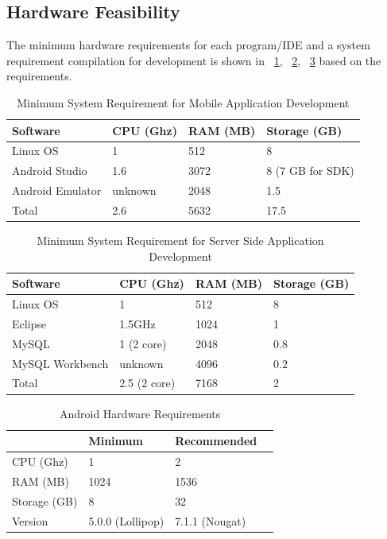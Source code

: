 \subsection{Hardware Feasibility}
The minimum hardware requirements for each program/IDE and
a system requirement compilation for development is shown in ~\ref{minreqmobile}, ~\ref{minreqserver}, ~\ref{androidhardware} based on the requirements.

\begin{table}[!ht]
\centering
\caption{Minimum System Requirement for Mobile Application Development}
\label{minreqmobile}
\begin{tabular}{|l|l|l|l|}
\hline
\textbf{Software}& \textbf{CPU (Ghz)} & \textbf{RAM (MB)}  & \textbf{Storage (GB)} \\ \hline
Linux OS \cite{linuxMinimumSystemRequirements} & 1 & 512 & 8 \\ \hline
Android Studio \cite{androidMinimumSystemRequirements} & 1.6 & 3072  & 8 (7 GB for SDK) \\ \hline
Android Emulator \cite{androidMinimumSystemRequirements} & unknown & 2048 & 1.5 \\ \hline
Total & 2.6 & 5632 & 17.5 \\ \hline
\end{tabular}
\end{table}

\begin{table}[!ht]
\centering
\caption{Minimum System Requirement for Server Side Application Development}
\label{minreqserver}
\begin{tabular}{|l|l|l|l|}
\hline
\textbf{Software}& \textbf{CPU (Ghz)} & \textbf{RAM (MB)}  & \textbf{Storage (GB)} \\ \hline
Linux OS \cite{linuxMinimumSystemRequirements} & 1 & 512 & 8 \\ \hline
Eclipse \cite{eclipse} & 1.5GHz & 1024  & 1  \\ \hline
MySQL \cite{mysql} & 1 (2 core) & 2048 & 0.8 \\ \hline
MySQL Workbench\cite{mysql} & unknown & 4096 & 0.2 \\ \hline
Total\cite{mysql} & 2.5 (2 core) & 7168 & 2 \\ \hline
\end{tabular}
\end{table}

\begin{table}[!ht]
\centering
\caption{Android Hardware Requirements}
\label{androidhardware}
\begin{tabular}{|l|l|l|l|}
\hline
            & \textbf{Minimum}    & \textbf{Recommended} \\\hline
CPU (Ghz) & 1      & 2     \\\hline
RAM (MB)      & 1024       & 1536        \\\hline
Storage (GB)   & 8     & 32       \\\hline
Version  & 5.0.0 (Lollipop)   & 7.1.1 (Nougat)      \\\hline
\end{tabular}
\end{table}

